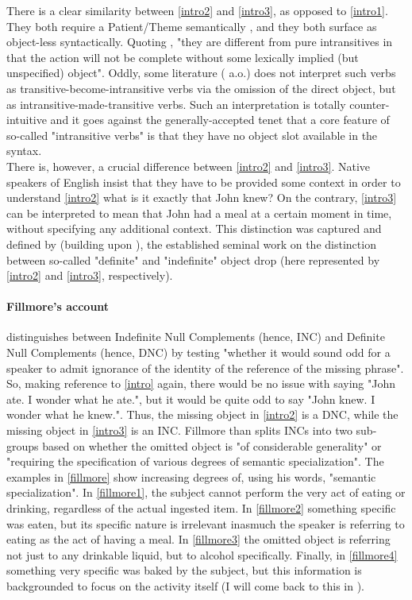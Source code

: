 There is a clear similarity between \ref{intro2} and \ref{intro3}, as opposed to \ref{intro1}. They both require a Patient/Theme semantically \parencite[510]{Somers1984}, and they both surface as object-less syntactically. Quoting \textcite[48]{Yasutake1987}, "they are different from pure intransitives in that the action will not be complete without some lexically implied (but unspecified) object". Oddly, some literature (\textcite{BourmayanRecanati2013, Liu2008} a.o.) does not interpret such verbs as transitive-become-intransitive verbs via the omission of the direct object, but as intransitive-made-transitive verbs. Such an interpretation is totally counter-intuitive and it goes against the generally-accepted tenet that a core feature of so-called "intransitive verbs" is that they have no object slot available in the syntax.\\
There is, however, a crucial difference between \ref{intro2} and \ref{intro3}. Native speakers of English insist that they have to be provided some context in order to understand \ref{intro2} \textemdash what is it exactly that John knew? On the contrary, \ref{intro3} can be interpreted to mean that John had a meal at a certain moment in time, without specifying any additional context. This distinction was captured and defined by \textcite{Fillmore1986} (building upon \textcite{fillmore1969types, Allerton1975}), the established seminal work on the distinction between so-called "definite" and "indefinite" object drop (here represented by \ref{intro2} and \ref{intro3}, respectively).

\paragraph{Fillmore's account}
\textcite[96]{Fillmore1986} distinguishes between Indefinite Null Complements (hence, INC) and Definite Null Complements (hence, DNC) by testing "whether it would sound odd for a speaker to admit ignorance of the identity of the reference of the missing phrase". So, making reference to \ref{intro} again, there would be no issue with saying "John ate. I wonder what he ate.", but it would be quite odd to say "John knew. I wonder what he knew.". Thus, the missing object in \ref{intro2} is a DNC, while the missing object in \ref{intro3} is an INC. Fillmore than splits INCs into two sub-groups based on whether the omitted object is "of considerable generality" or "requiring the specification of various degrees of semantic specialization". The examples in \ref{fillmore} \parencite[96-97]{Fillmore1986} show increasing degrees of, using his words, "semantic specialization". In \ref{fillmore1}, the subject cannot perform the very act of eating or drinking, regardless of the actual ingested item. In \ref{fillmore2} something specific was eaten, but its specific nature is irrelevant inasmuch the speaker is referring to eating as the act of having a meal. In \ref{fillmore3} the omitted object is referring not just to any drinkable liquid, but to alcohol specifically. Finally, in \ref{fillmore4} something very specific was baked by the subject, but this information is backgrounded to focus on the activity itself (I will come back to this in ).

